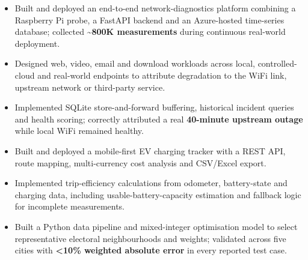 \begin{itemize}
  \item Built and deployed an end-to-end network-diagnostics platform combining a Raspberry Pi probe, a FastAPI backend and an Azure-hosted time-series database; collected \textbf{\textasciitilde 800K measurements} during continuous real-world deployment.
  \item Designed web, video, email and download workloads across local, controlled-cloud and real-world endpoints to attribute degradation to the WiFi link, upstream network or third-party service.
  \item Implemented SQLite store-and-forward buffering, historical incident queries and health scoring; correctly attributed a real \textbf{40-minute upstream outage} while local WiFi remained healthy.
\end{itemize}
\vspace{2pt}
\begin{itemize}
  \item Built and deployed a mobile-first EV charging tracker with a REST API, route mapping, multi-currency cost analysis and CSV/Excel export.
  \item Implemented trip-efficiency calculations from odometer, battery-state and charging data, including usable-battery-capacity estimation and fallback logic for incomplete measurements.
\end{itemize}
\vspace{2pt}
\begin{itemize}
  \item Built a Python data pipeline and mixed-integer optimisation model to select representative electoral neighbourhoods and weights; validated across five cities with \textbf{<10\% weighted absolute error} in every reported test case.
\end{itemize}
